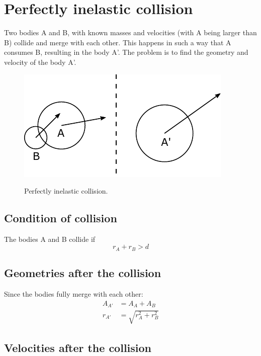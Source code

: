 \documentclass{article}
\begin{document}
\section{Perfectly inelastic collision}
\label{sec:prefectly_inelastic_collision}
Two bodies A and B, with known masses and velocities (with A being larger than B) collide and merge with each other. This happens in such a way that A consumes B, resulting in the body A'. The problem is to find the geometry and velocity of the body A'.

\begin{figure}[h]
	\centering
	{\includegraphics{figures/perfectly_inelastic_collision.pdf}}
	\caption{Perfectly inelastic collision.}\label{fig:perfectly_inelastic_collision}
\end{figure}

\subsection{Condition of collision}
The bodies A and B collide if
\begin{equation}
r_A + r_B > d
\end{equation}

\subsection{Geometries after the collision}
Since the bodies fully merge with each other:
\begin{equation}
\begin{split}
A_{A'} &= A_A + A_B\\
r_{A'} &= \sqrt{r_A^2 + r_B^2}
\end{split}
\end{equation}


\subsection{Velocities after the collision}
\end{document}
